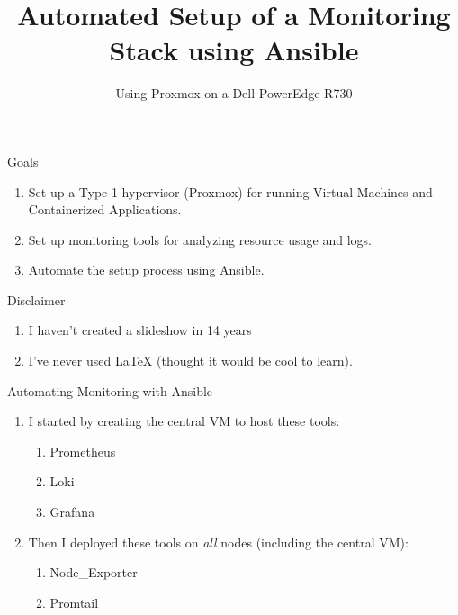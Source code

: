 \documentclass[14pt,compress,usenames,dvipsnames,aspectratio=169]{beamer}
\title{\textbf{Automated Setup of a Monitoring Stack using Ansible}}
\author{Using Proxmox on a Dell PowerEdge R730}
\date{}  %
\begin{document}

\begin{frame}[plain]
\titlepage
\end{frame}



\begin{frame}{Goals}
    \begin{enumerate}
        \item{Set up a Type 1 hypervisor (Proxmox) for running Virtual Machines and
            Containerized Applications.} 
        \item{Set up monitoring tools for analyzing resource usage and logs. }
        \item{Automate the setup process using Ansible.}
    \end{enumerate}
\end{frame}


\begin{frame}{Disclaimer}
    \begin{enumerate}
        \item{I haven't created a slideshow in 14 years} 
        \item{I've never used LaTeX (thought it would be cool to learn).}
    \end{enumerate}
\end{frame}




\begin{frame}{Automating Monitoring with Ansible}
    \begin{enumerate}
        \item{I started by creating the central VM to host these tools:} 
            \begin{enumerate}
                \item{Prometheus }
                \item{Loki }
                \item{Grafana }
            \end{enumerate}

        \item{Then I deployed these tools on \textit{all} nodes (including the central VM):}
            \begin{enumerate}
                \item{Node\_Exporter}
                \item{Promtail}
            \end{enumerate}
    \end{enumerate}
\end{frame}
\end{document}
